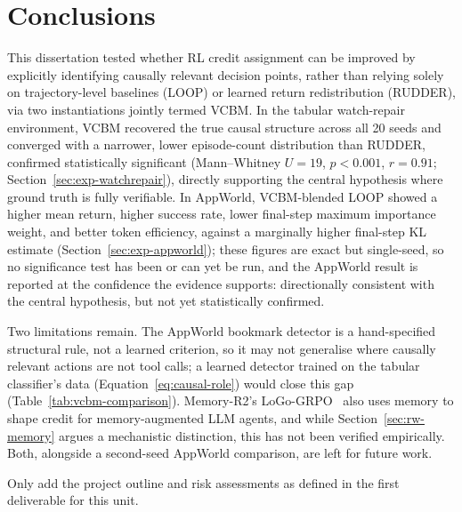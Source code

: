 
\section{Conclusions}
\label{sec:conclusions}

This dissertation tested whether RL credit assignment can be improved by explicitly identifying causally relevant decision points, rather than relying solely on trajectory-level baselines (LOOP) or learned return redistribution (RUDDER), via two instantiations jointly termed VCBM. In the tabular watch-repair environment, VCBM recovered the true causal structure across all 20 seeds and converged with a narrower, lower episode-count distribution than RUDDER, confirmed statistically significant (Mann--Whitney $U=19$, $p<0.001$, $r=0.91$; Section~\ref{sec:exp-watchrepair}), directly supporting the central hypothesis where ground truth is fully verifiable. In AppWorld, VCBM-blended LOOP showed a higher mean return, higher success rate, lower final-step maximum importance weight, and better token efficiency, against a marginally higher final-step KL estimate (Section~\ref{sec:exp-appworld}); these figures are exact but single-seed, so no significance test has been or can yet be run, and the AppWorld result is reported at the confidence the evidence supports: directionally consistent with the central hypothesis, but not yet statistically confirmed.

Two limitations remain. The AppWorld bookmark detector is a hand-specified structural rule, not a learned criterion, so it may not generalise where causally relevant actions are not tool calls; a learned detector trained on the tabular classifier's data (Equation~\ref{eq:causal-role}) would close this gap (Table~\ref{tab:vcbm-comparison}). Memory-R2's LoGo-GRPO~\cite{memoryr22026} also uses memory to shape credit for memory-augmented LLM agents, and while Section~\ref{sec:rw-memory} argues a mechanistic distinction, this has not been verified empirically. Both, alongside a second-seed AppWorld comparison, are left for future work.

\clearpage %
\printbibliography[title={References},heading=bibintoc] %

\begin{uomappendix}
  Only add the project outline and risk assessments as defined in the first deliverable for this unit.
\end{uomappendix}

